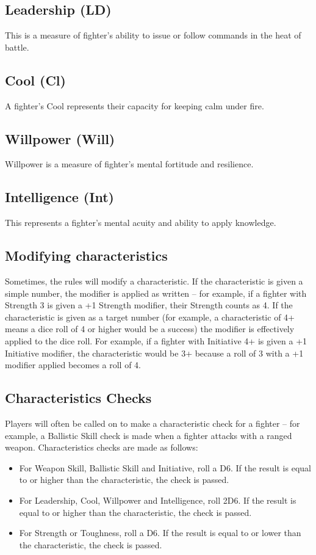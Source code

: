 \begin{multicols}{2}
\subsection{Leadership (LD)}
This is a measure of fighter’s ability to issue or follow
commands in the heat of battle.

\subsection{Cool (Cl)}
A fighter’s Cool represents their capacity for keeping calm
under fire.

\subsection{Willpower (Will)}
Willpower is a measure of fighter’s mental fortitude and
resilience.

\subsection{Intelligence (Int)}
This represents a fighter’s mental acuity and ability to
apply knowledge.

\subsection{Modifying characteristics}
Sometimes, the rules will modify a characteristic. If the
characteristic is given a simple number, the modifier is
applied as written – for example, if a fighter with Strength
3 is given a +1 Strength modifier, their Strength counts as
4.
If the characteristic is given as a target number (for
example, a characteristic of 4+ means a dice roll of 4 or
higher would be a success) the modifier is effectively
applied to the dice roll. For example, if a fighter with
Initiative 4+ is given a +1 Initiative modifier, the
characteristic would be 3+ because a roll of 3 with a +1
modifier applied becomes a roll of 4.


\subsection{Characteristics Checks}
Players will often be called on to make a characteristic
check for a fighter – for example, a Ballistic Skill check is
made when a fighter attacks with a ranged weapon.
Characteristics checks are made as follows:
\begin{itemize}
  \item For Weapon Skill, Ballistic Skill and Initiative, roll a
  D6. If the result is equal to or higher than the
  characteristic, the check is passed.
  \item For Leadership, Cool, Willpower and Intelligence,
  roll 2D6. If the result is equal to or higher than the
  characteristic, the check is passed.
  \item For Strength or Toughness, roll a D6. If the result is
  equal to or lower than the characteristic, the check
  is passed.
\end{itemize}

\end{multicols}

